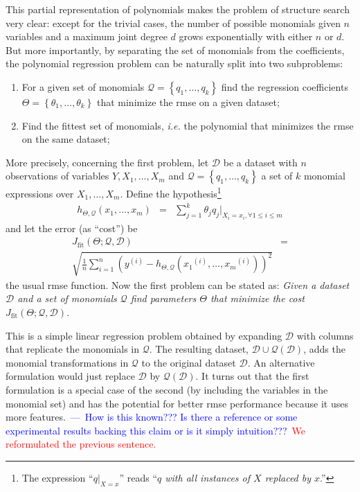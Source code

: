 \documentclass[review,preprint]{elsarticle}
\newcommand{\sample}[1]{\ensuremath{^{\left(#1\right)}}}
\newcommand{\review}[1]{\textcolor{blue}{~---~#1}}
\newcommand{\revised}[2]{\review{#1}~\textcolor{red}{#2}}
\begin{document}
This partial representation of polynomials makes the problem of structure search very clear: except for the trivial cases, the number of possible monomials given $n$ variables and a maximum joint degree $d$ grows exponentially with either $n$ or $d$. But more importantly, by separating the set of monomials from the coefficients, the polynomial regression problem can be naturally split into two subproblems:
%
\begin{enumerate}
\item For a given set of monomials $\mathcal{Q} = \left\lbrace q_1, \ldots, q_k\right\rbrace$ find the regression coefficients $\Theta = \left\lbrace \theta_1,\ldots,\theta_k \right\rbrace$ that minimize the \ac{rmse} on a given dataset;

\item Find the fittest set of monomials, \emph{i.e.} the polynomial that minimizes the \ac{rmse} on the same dataset;
\end{enumerate}
%
More precisely, concerning the first problem, let $\mathcal{D}$ be a dataset with $n$ observations of variables $Y, X_1,\ldots,X_m$ and $\mathcal{Q} = \left\lbrace q_1,\ldots, q_k\right\rbrace$ a set of $k$ monomial expressions over $X_1,\ldots,X_m$. Define the hypothesis\footnote{The expression ``$q|_{X=x}$'' reads ``\emph{$q$ with all instances of $X$ replaced by $x$}.''}
%
\begin{eqnarray}
h_{\Theta,\mathcal{Q}}\left(x_1,\ldots,x_m\right) &=& \sum_{j = 1}^k \theta_j q_j|_{X_i=x_i,\forall 1 \leq i \leq m}
\end{eqnarray}
%
and let the error (as ``cost'') be
%
\begin{eqnarray}
J_{\textrm{fit}}\left(\Theta;\mathcal{Q},\mathcal{D}\right)  & =  \nonumber \\
\sqrt{\frac{1}{n}\sum_{i=1}^n \left( y\sample{i} - h_{\Theta,\mathcal{Q}}\left( x_1\sample{i},\ldots,x_m\sample{i} \right) \right)^2 }\label{eq:rmse}
\end{eqnarray}
%
the usual \acf{rmse} function. Now the first problem can be stated as:
%
\emph{Given a dataset $\mathcal{D}$ and a set of monomials $\mathcal{Q}$ find parameters $\Theta$ that minimize the cost $J_{\textrm{fit}}\left(\Theta;\mathcal{Q},\mathcal{D}\right)$.}

%
This is a simple linear regression problem obtained by expanding $\mathcal{D}$ with columns that replicate the monomials in $\mathcal{Q}$. The resulting dataset, $\mathcal{D} \cup \mathcal{Q}\left( \mathcal{D} \right)$, adds the monomial transformations in $\mathcal{Q}$ to the original dataset $\mathcal{D}$. An alternative formulation would just replace $\mathcal{D}$ by $\mathcal{Q}\left( \mathcal{D} \right)$. It turns out that the first formulation is a special case of the second (by including the variables in the monomial set) and has the potential for better \ac{rmse} performance because it uses more features.\revised{How is this known??? Is there a reference or some experimental results backing this claim or is it simply intuition???}{We reformulated the previous sentence.}
\end{document}
